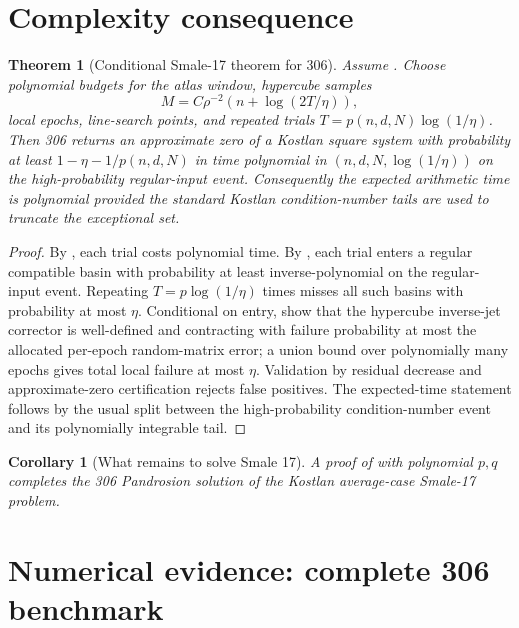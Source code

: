 \documentclass[11pt]{article}
\newtheorem{theorem}[definition]{Theorem}
\newtheorem{corollary}[definition]{Corollary}
\begin{document}
\section{Complexity consequence}\label{sec:complexity}

\begin{theorem}[Conditional Smale-17 theorem for 306]\label{thm:conditional-smale}
Assume .  Choose polynomial budgets for the atlas window, hypercube samples
\[
        M=C\rho^{-2}(n+\log(2T/\eta)),
\]
local epochs, line-search points, and repeated trials $T=p(n,d,N)\log(1/\eta)$.  Then 306 returns an approximate zero of a Kostlan square system with probability at least $1-\eta-1/p(n,d,N)$ in time polynomial in $(n,d,N,\log(1/\eta))$ on the high-probability regular-input event.  Consequently the expected arithmetic time is polynomial provided the standard Kostlan condition-number tails are used to truncate the exceptional set.
\end{theorem}

\begin{proof}
By , each trial costs polynomial time.  By , each trial enters a regular compatible basin with probability at least inverse-polynomial on the regular-input event.  Repeating $T=p\log(1/\eta)$ times misses all such basins with probability at most $\eta$.  Conditional on entry,  show that the hypercube inverse-jet corrector is well-defined and contracting with failure probability at most the allocated per-epoch random-matrix error; a union bound over polynomially many epochs gives total local failure at most $\eta$.  Validation by residual decrease and approximate-zero certification rejects false positives.  The expected-time statement follows by the usual split between the high-probability condition-number event and its polynomially integrable tail.
\end{proof}

\begin{corollary}[What remains to solve Smale 17]
A proof of  with polynomial $p,q$ completes the 306 Pandrosion solution of the Kostlan average-case Smale-17 problem.
\end{corollary}

\section{Numerical evidence: complete 306 benchmark}
\end{document}
